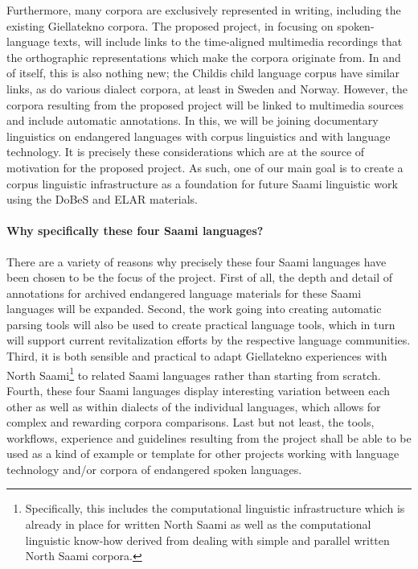 \documentclass[a4paper,12pt]{article}
\begin{document}
Furthermore, many corpora are exclusively represented in writing, including the existing Giellatekno corpora. The proposed project, in focusing on spoken-language texts, will include links to the time-aligned multimedia recordings that the orthographic representations which make the corpora originate from. In and of itself, this is also nothing new; the Childis child language corpus have similar links, as do various dialect corpora, at least in Sweden and Norway.%
However, the corpora resulting from the proposed project will be linked to multimedia sources and include automatic annotations. In this, we will be joining documentary linguistics on endangered languages with corpus linguistics and with language technology. It is precisely these considerations which are at the source of motivation for the proposed project. As such, one of our main goal is to create a corpus linguistic infrastructure as a foundation for future Saami linguistic work using the DoBeS and ELAR materials. %

\paragraph{Why specifically these four Saami languages?}
There are a variety of reasons why precisely these four Saami languages have been chosen to be the focus of the project. First of all, the depth and detail of annotations for archived endangered language materials for these Saami languages will be expanded. Second, the work going into creating automatic parsing tools will also be used to create practical language tools, which in turn will support current revitalization efforts by the respective language communities. Third, it is both sensible and practical to adapt Giellatekno experiences with North Saami\footnote{Specifically, this includes the computational linguistic infrastructure which is already in place for written North Saami as well as the computational linguistic know-how derived from dealing with simple and parallel written North Saami corpora.} to related Saami languages rather than starting from scratch. Fourth, these four Saami languages display interesting variation between each other as well as within dialects of the individual languages, which allows for complex and rewarding corpora comparisons. Last but not least, the tools, workflows, experience and guidelines resulting from the project shall be able to be used as a kind of example or template for other projects working with language technology and/or corpora of endangered spoken languages.%
\end{document}
